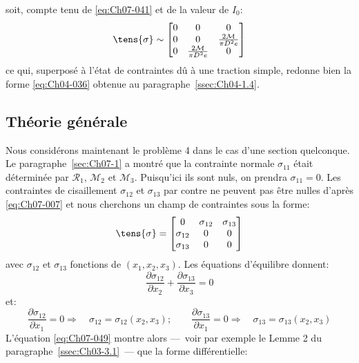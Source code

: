 soit, compte tenu de \eqref{eq:Ch07-041} et de la valeur de $I_0$:
\begin{equation}
    \tens{\sigma} \sim
    \begin{bmatrix}
        0 & 0 & 0 \\
        0 & 0 & \frac{2\mathcal{M}}{\pi D^2 e} \\
        0 & \frac{2\mathcal{M}}{\pi D^2 e} & 0
    \end{bmatrix}
    \label{eq:Ch07-047}
\end{equation}
ce qui, superposé à l'état de contraintes dû à une traction simple, redonne bien la forme \eqref{eq:Ch04-036} obtenue au paragraphe~\ref{ssec:Ch04-1.4}.
\subsection{Théorie générale} \label{ssec:Ch07-2.2}
Nous considérons maintenant le problème 4 dans le cas d'une section quelconque.
Le paragraphe~\ref{sec:Ch07-1} a montré que la contrainte normale $\sigma_{11}$ était déterminée par $\mathcal{R}_1$, $\mathcal{M}_2$ et $\mathcal{M}_3$.
Puisqu'ici ils sont nuls, on prendra $\sigma_{11}=0$.
Les contraintes de cisaillement $\sigma_{12}$ et $\sigma_{13}$ par contre ne peuvent pas être nulles d'après \eqref{eq:Ch07-007} et nous cherchons un champ de contraintes sous la forme:
\begin{equation}
    \tens{\sigma} = 
    \begin{bmatrix}
        0 & \sigma_{12} & \sigma_{13} \\
        \sigma_{12} & 0 & 0\\
        \sigma_{13} & 0 & 0
    \end{bmatrix}
    \label{eq:Ch07-048}
\end{equation}
avec $\sigma_{12}$ et $\sigma_{13}$ fonctions de $\left( x_1, x_2, x_3 \right)$.
Les équations d'équilibre donnent:
\begin{equation}
    \frac{\partial \sigma_{12}}{\partial x_2} + \frac{\partial \sigma_{13}}{\partial x_3} = 0
    \label{eq:Ch07-049}
\end{equation}
et:
\begin{equation}
        \frac{\partial \sigma_{12}}{\partial x_1} = 0 \Rightarrow \quad \sigma_{12} = \sigma_{12} \left( x_2, x_3 \right); \qquad
        \frac{\partial \sigma_{13}}{\partial x_1} = 0 \Rightarrow \quad \sigma_{13} = \sigma_{13} \left( x_2, x_3 \right)
    \label{eq:Ch07-050}
\end{equation}
L'équation \eqref{eq:Ch07-049} montre alors ---~voir par exemple le Lemme 2 du paragraphe~\ref{ssec:Ch03-3.1}~--- que la forme différentielle:

